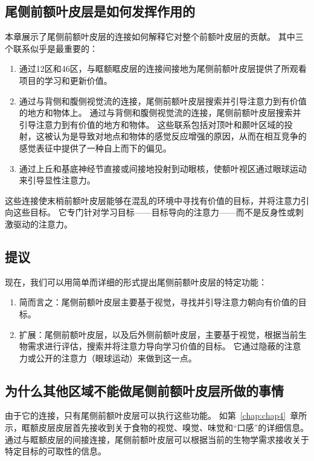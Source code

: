 \subsection{尾侧前额叶皮层是如何发挥作用的}

本章展示了尾侧前额叶皮层的连接如何解释它对整个前额叶皮层的贡献。
其中三个联系似乎是最重要的：

\begin{enumerate}
	\item 通过12区和46区，与眶额眶皮层的连接间接地为尾侧前额叶皮层提供了所观看项目的学习和更新价值\cite{barbas1989architecture}。
	\item 通过与背侧和腹侧视觉流的连接，尾侧前额叶皮层搜索并引导注意力到有价值的地方和物体上。
	通过与背侧和腹侧视觉流的连接，尾侧前额叶皮层搜索并引导注意力到有价值的地方和物体。
	这些联系包括对顶叶和颞叶区域的投射，这被认为是导致对地点和物体的感觉反应增强的原因，从而在相互竞争的感觉表征中提供了一种自上而下的偏见。
	\item 通过上丘和基底神经节直接或间接地投射到动眼核，使额叶视区通过眼球运动来引导显性注意力。
\end{enumerate}

这些连接使末梢前额叶皮层能够在混乱的环境中寻找有价值的目标，并将注意力引向这些目标。
它专门针对学习目标——目标导向的注意力——而不是反身性或刺激驱动的注意力。



\subsection{提议}

现在，我们可以用简单而详细的形式提出尾侧前额叶皮层的特定功能：

\begin{enumerate}
	\item 简而言之：尾侧前额叶皮层主要基于视觉，寻找并引导注意力朝向有价值的目标。
	\item 扩展：尾侧前额叶皮层，以及后外侧前额叶皮层，主要基于视觉，根据当前生物需求进行评估，搜索并将注意力导向学习价值的目标。
	它通过隐蔽的注意力或公开的注意力（眼球运动）来做到这一点。
\end{enumerate}



\subsection{为什么其他区域不能做尾侧前额叶皮层所做的事情}

由于它的连接，只有尾侧前额叶皮层可以执行这些功能。
如第~\ref{chap:chap4}~章所示，眶额皮层皮层首先接收到关于食物的视觉、嗅觉、味觉和“口感”的详细信息。
通过与眶额皮层的间接连接，尾侧前额叶皮层可以根据当前的生物学需求接收关于特定目标的可取性的信息。


